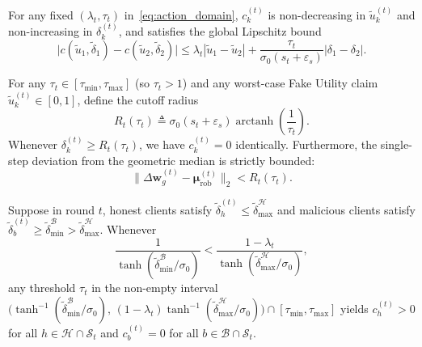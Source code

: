 \begin{lemma}
\label{lem:mono_lip}
For any fixed $(\lambda_t, \tau_t)$ in~\eqref{eq:action_domain}, $c_k^{(t)}$ is non-decreasing in $\tilde{u}_k^{(t)}$ and non-increasing in $\delta_k^{(t)}$, and satisfies the global Lipschitz bound
\begin{equation}
    \big|c(\tilde{u}_1, \tilde{\delta}_1) - c(\tilde{u}_2, \tilde{\delta}_2)\big|
    \le \lambda_t |\tilde{u}_1 - \tilde{u}_2| + \frac{\tau_t}{\sigma_0 (s_t + \varepsilon_s)} |\delta_1 - \delta_2|.
    \label{eq:lip_bound}
\end{equation}
\end{lemma}

\begin{proposition}
\label{prop:cutoff}
For any $\tau_t \in [\tau_{\min}, \tau_{\max}]$ (so $\tau_t > 1$) and any worst-case Fake Utility claim $\tilde{u}_k^{(t)} \in [0, 1]$, define the cutoff radius
\begin{equation}
    R_t(\tau_t) \triangleq \sigma_0 (s_t + \varepsilon_s) \operatorname{arctanh}\!\left(\frac{1}{\tau_t}\right).
    \label{eq:cutoff_radius}
\end{equation}
Whenever $\delta_k^{(t)} \ge R_t(\tau_t)$, we have $c_k^{(t)} = 0$ identically. Furthermore, the single-step deviation from the geometric median is strictly bounded:
\begin{equation}
    \big\|\Delta\mathbf{w}_g^{(t)} - \boldsymbol{\mu}_{\mathrm{rob}}^{(t)}\big\|_2 < R_t(\tau_t).
    \label{eq:agg_bias_bound}
\end{equation}
\end{proposition}

\begin{proposition}
\label{prop:separation}
Suppose in round $t$, honest clients satisfy $\tilde{\delta}_h^{(t)} \le \tilde{\delta}_{\max}^{\mathcal{H}}$ and malicious clients satisfy $\tilde{\delta}_b^{(t)} \ge \tilde{\delta}_{\min}^{\mathcal{B}} > \tilde{\delta}_{\max}^{\mathcal{H}}$. Whenever
\begin{equation}
    \frac{1}{\tanh(\tilde{\delta}_{\min}^{\mathcal{B}} / \sigma_0)} < \frac{1 - \lambda_t}{\tanh(\tilde{\delta}_{\max}^{\mathcal{H}} / \sigma_0)},
    \label{eq:sep_margin}
\end{equation}
any threshold $\tau_t$ in the non-empty interval $\big(\tanh^{-1}(\tilde{\delta}_{\min}^{\mathcal{B}}/\sigma_0),\, (1-\lambda_t)\tanh^{-1}(\tilde{\delta}_{\max}^{\mathcal{H}}/\sigma_0)\big) \cap [\tau_{\min}, \tau_{\max}]$ yields $c_h^{(t)} > 0$ for all $h \in \mathcal{H}\cap\mathcal{S}_t$ and $c_b^{(t)} = 0$ for all $b \in \mathcal{B}\cap\mathcal{S}_t$.
\end{proposition}

